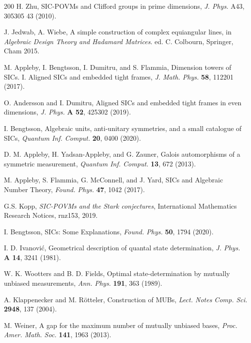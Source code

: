 \documentclass[english,aps,pra,nofootinbib,twocolumn,superscriptaddress]{revtex4-1}
\newcommand{\1}{{\rm 1\hspace{-0.9mm}l}}
\begin{document}
\begin{thebibliography}{200}
 H. Zhu, 
SIC-POVMs and Clifford groups in prime dimensions,
{\sl  J. Phys.} {A43}, 305305 43 (2010).

 J. Jedwab, A. Wiebe, A simple construction of complex equiangular lines,
in {\sl  Algebraic Design Theory and Hadamard Matrices}. 
 ed. C. Colbourn, Springer, Cham 2015. %
 
 
M. Appleby, I. Bengtsson, I. Dumitru, and S. Flammia,
Dimension towers of SICs. I. Aligned SICs and embedded tight frames,
{\sl J. Math. Phys.} {\bf  58}, 112201 (2017).

 O. Andersson and I. Dumitru,
Aligned SICs and embedded tight frames in even dimensions,
{\sl  J. Phys.} {\bf  A 52}, 425302 (2019). 

 I. Bengtsson, Algebraic units, anti-unitary symmetries, and a small catalogue of SICs,
{\sl Quantum Inf. Comput.} {\bf 20}, 0400 (2020).

 D. M. Appleby, H. Yadsan-Appleby, and G. Zauner, 
Galois automorphisms of a symmetric measurement,
{\sl Quantum Inf. Comput.} {\bf 13}, 672 (2013).

M. Appleby, S. Flammia,  G. McConnell, and J. Yard, 
SICs and Algebraic Number Theory, 
{\sl  Found. Phys.} {\bf  47}, 1042 (2017).

 G.S. Kopp,
{\sl SIC-POVMs and the Stark conjectures}, 
International Mathematics Research Notices, rnz153, 2019.

 I. Bengtsson,  
SICs: Some Explanations, 
{\sl Found. Phys.} {\bf  50},  1794 (2020).



 I. D. Ivanovi{\'c}, 
Geometrical description of quantal state determination, 
{\sl J. Phys.} {\bf  A 14}, 3241 (1981).

 W. K. Wootters and B. D. Fields, 
Optimal state-determination by mutually unbiased measurements, 
{\sl Ann. Phys.} {\bf  191}, 363 (1989).

 A. Klappenecker and M. R{\"o}tteler, 
 Construction of MUBs, 
{\sl Lect. Notes  Comp. Sci.} {\bf 2948}, 137 (2004).

 M. Weiner,
A gap for the maximum number of mutually unbiased bases,
{\sl   Proc. Amer. Math. Soc.} {\bf 141}, 1963 (2013).


\end{thebibliography}
\end{document}
